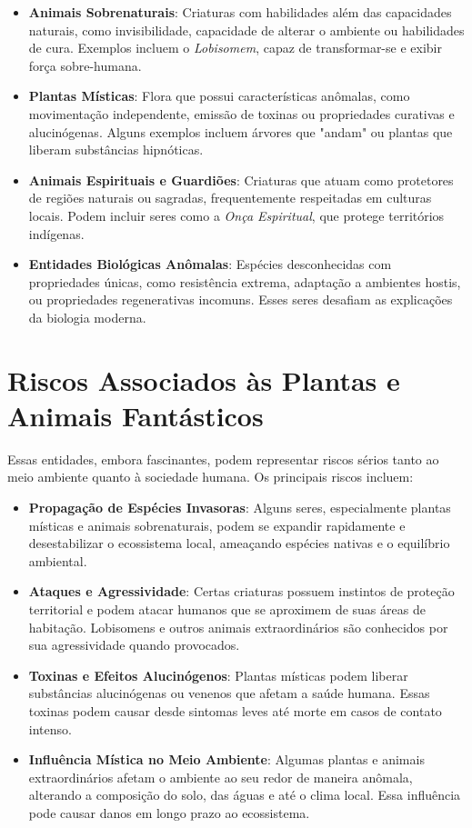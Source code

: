 \begin{itemize}
    \item \textbf{Animais Sobrenaturais}: Criaturas com habilidades além das capacidades naturais, como invisibilidade, capacidade de alterar o ambiente ou habilidades de cura. Exemplos incluem o \textit{Lobisomem}, capaz de transformar-se e exibir força sobre-humana.
    \item \textbf{Plantas Místicas}: Flora que possui características anômalas, como movimentação independente, emissão de toxinas ou propriedades curativas e alucinógenas. Alguns exemplos incluem árvores que "andam" ou plantas que liberam substâncias hipnóticas.
    \item \textbf{Animais Espirituais e Guardiões}: Criaturas que atuam como protetores de regiões naturais ou sagradas, frequentemente respeitadas em culturas locais. Podem incluir seres como a \textit{Onça Espiritual}, que protege territórios indígenas.
    \item \textbf{Entidades Biológicas Anômalas}: Espécies desconhecidas com propriedades únicas, como resistência extrema, adaptação a ambientes hostis, ou propriedades regenerativas incomuns. Esses seres desafiam as explicações da biologia moderna.
\end{itemize}

\section{Riscos Associados às Plantas e Animais Fantásticos}
Essas entidades, embora fascinantes, podem representar riscos sérios tanto ao meio ambiente quanto à sociedade humana. Os principais riscos incluem:

\begin{itemize}
    \item \textbf{Propagação de Espécies Invasoras}: Alguns seres, especialmente plantas místicas e animais sobrenaturais, podem se expandir rapidamente e desestabilizar o ecossistema local, ameaçando espécies nativas e o equilíbrio ambiental.
    \item \textbf{Ataques e Agressividade}: Certas criaturas possuem instintos de proteção territorial e podem atacar humanos que se aproximem de suas áreas de habitação. Lobisomens e outros animais extraordinários são conhecidos por sua agressividade quando provocados.
    \item \textbf{Toxinas e Efeitos Alucinógenos}: Plantas místicas podem liberar substâncias alucinógenas ou venenos que afetam a saúde humana. Essas toxinas podem causar desde sintomas leves até morte em casos de contato intenso.
    \item \textbf{Influência Mística no Meio Ambiente}: Algumas plantas e animais extraordinários afetam o ambiente ao seu redor de maneira anômala, alterando a composição do solo, das águas e até o clima local. Essa influência pode causar danos em longo prazo ao ecossistema.
\end{itemize}

